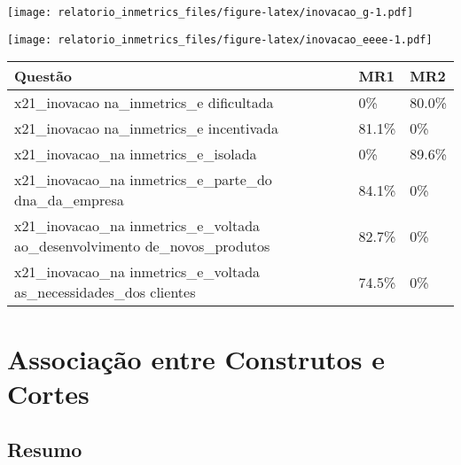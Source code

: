 \documentclass[]{book}
\begin{document}
\texttt{[image: relatorio\_inmetrics\_files/figure-latex/inovacao\_g-1.pdf]}

\texttt{[image: relatorio\_inmetrics\_files/figure-latex/inovacao\_eeee-1.pdf]}

\begin{table}[H]
\centering\begingroup\fontsize{12}{14}\selectfont

\begin{tabular}{>{\raggedright\arraybackslash}p{20em}ll}
\toprule
Questão & MR1 & MR2\\
\midrule
x21\_inovacao
na\_inmetrics\_e
dificultada & 0\% & 80.0\%\\
x21\_inovacao
na\_inmetrics\_e
incentivada & 81.1\% & 0\%\\
x21\_inovacao\_na
inmetrics\_e\_isolada & 0\% & 89.6\%\\
x21\_inovacao\_na
inmetrics\_e\_parte\_do
dna\_da\_empresa & 84.1\% & 0\%\\
x21\_inovacao\_na
inmetrics\_e\_voltada
ao\_desenvolvimento
de\_novos\_produtos & 82.7\% & 0\%\\
\addlinespace
x21\_inovacao\_na
inmetrics\_e\_voltada
as\_necessidades\_dos
clientes & 74.5\% & 0\%\\
\bottomrule
\end{tabular}
\endgroup{}
\end{table}

\hypertarget{associacao-entre-construtos-e-cortes}{%
\chapter{Associação entre Construtos e Cortes}\label{associacao-entre-construtos-e-cortes}}

\hypertarget{resumo}{%
\section{Resumo}\label{resumo}}
\end{document}
